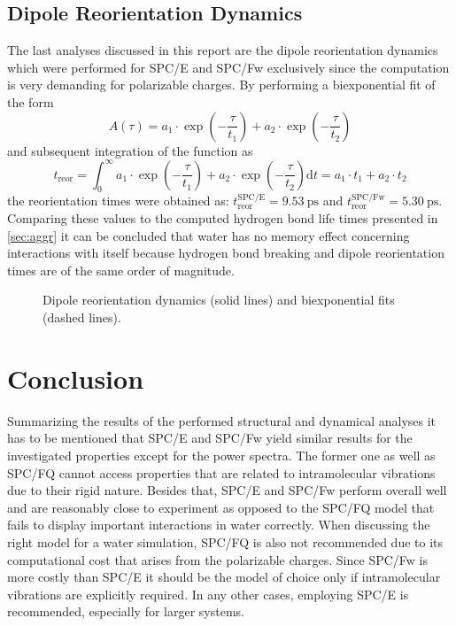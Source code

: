 \documentclass[a4paper,12pt]{scrartcl}
\newcommand{\m}[1]{\mathrm{#1}}
\begin{document}
	\subsection{Dipole Reorientation Dynamics}
		The last analyses discussed in this report are the dipole reorientation dynamics which were performed for SPC/E and SPC/Fw exclusively since the computation is very demanding for polarizable charges. By performing a biexponential fit of the form
		\begin{equation}
			A(\tau) = a_1 \cdot \exp\left( -\frac{\tau}{t_1} \right) + a_2 \cdot \exp\left( -\frac{\tau}{t_2} \right)
		\end{equation}
		and subsequent integration of the function as
		\begin{equation}
			t_\m{reor} = 
			\int_{0}^{\infty} a_1 \cdot \exp\left( -\frac{\tau}{t_1} \right) + a_2 \cdot \exp\left( -\frac{\tau}{t_2} \right) \m{d}t = a_1 \cdot t_1 + a_2 \cdot t_2
		\end{equation} 
		the reorientation times were obtained as: $ t_\m{reor}^\m{SPC/E}=\SI{9.53}{\pico\second} $ and $ t_\m{reor}^\m{SPC/Fw}=\SI{5.30}{\pico\second} $. Comparing these values to the computed hydrogen bond life times presented in \autoref{sec:aggr} it can be concluded that water has no memory effect concerning interactions with itself because hydrogen bond breaking and dipole reorientation times are of the same order of magnitude.
		\begin{figure}
			\centering
			
			\vspace{-20pt}
			\caption{Dipole reorientation dynamics (solid lines) and biexponential fits (dashed lines).}
			\label{fig:rdyn}
		\end{figure}
\section{Conclusion}
%
	Summarizing the results of the performed structural and dynamical analyses it has to be mentioned that SPC/E and SPC/Fw yield similar results for the investigated properties except for the power spectra. The former one as well as SPC/FQ cannot access properties that are related to intramolecular vibrations due to their rigid nature. Besides that, SPC/E and SPC/Fw perform overall well and are reasonably close to experiment as opposed to the SPC/FQ model that fails to display important interactions in water correctly. When discussing the right model for a water simulation, SPC/FQ is also not recommended due to its computational cost that arises from the polarizable charges. Since SPC/Fw is more costly than SPC/E it should be the model of choice only if intramolecular vibrations are explicitly required. In any other cases, employing SPC/E is recommended, especially for larger systems.
\newpage
\printbibliography[title={Literature}]
%
\end{document}

